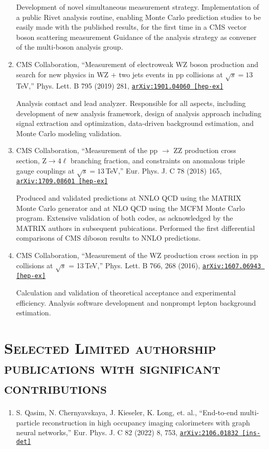 \documentclass[10pt]{res} %
\begin{document}
\begin{resume}
\begin{enumerate}
    Development of novel simultaneous measurement strategy. 
    Implementation of a public Rivet analysis routine, enabling Monte Carlo prediction studies to be easily made 
    with the published results, for the first time in a CMS vector boson scattering measurement
    Guidance of the analysis strategy as convener of the multi-boson analysis group.
  \item CMS Collaboration, ``Measurement of electroweak WZ boson production and search for new physics in WZ $+$ two jets events in pp collisions at $\sqrt{s}=13$\,TeV,'' Phys. Lett. B 795 (2019) 281, \href{https://arxiv.org/abs/1901.04060} {\texttt{arXiv:1901.04060 [hep-ex]}}

    Analysis contact and lead analyzer. Responsible for all aspects, 
    including development of new analysis framework, design of analysis approach including signal extraction and optimization,
    data-driven background estimation, and Monte Carlo modeling validation. 
  \item CMS Collaboration, ``Measurement of the pp $\rightarrow$ ZZ production cross section, $\mathrm{Z} \to 4\ell$ branching fraction, and constraints on anomalous triple gauge couplings at $\sqrt{s} = 13$\,TeV,'' Eur. Phys. J. C 78 (2018) 165, \href{https://arxiv.org/abs/1709.08601}{\texttt{arXiv:1709.08601 [hep-ex]}}

    Produced and validated predictions at NNLO QCD using the MATRIX Monte Carlo generator and at NLO QCD using the MCFM Monte Carlo program.
    Extensive validation of both codes, as acknowledged by the MATRIX authors in subsequent pubications.
    Performed the first differential comparisons of CMS diboson results to NNLO predictions.

  \item CMS Collaboration, ``Measurement of the WZ production cross section in pp collisions at $\sqrt{s}$ = 13\,TeV,''
Phys. Lett. B 766, 268 (2016), \href{https://arxiv.org/abs/1607.06943}{\texttt{arXiv:1607.06943 [hep-ex]}}

    Calculation and validation of theoretical acceptance and experimental efficiency. 
    Analysis software development and nonprompt lepton background estimation.
\end{enumerate}

\section{\textsc{Selected Limited authorship publications with significant contributions}}
\begin{enumerate}\addtocounter{enumi}{7}
  \item S. Qasim, N. Chernyavskaya, J. Kieseler, K. Long, et. al., ``End-to-end multi-particle reconstruction in high occupancy imaging calorimeters with graph neural networks,'' 
    Eur. Phys. J. C 82 (2022) 8, 753, \href{https://arxiv.org/abs/2106.01832}{\texttt{arXiv:2106.01832 [ins-det]}}


\end{enumerate}
\end{resume}
\end{document}
